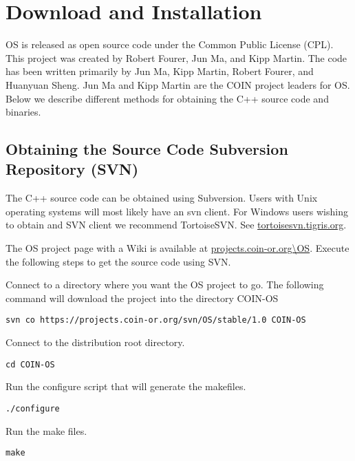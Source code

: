 \documentclass[11pt]{article}
\renewcommand{\_}{{\char"5F}}
\renewcommand{\{}{{\char"7B}}
\renewcommand{\}}{{\char"7D}}
\renewcommand{\^}{{\char"0D}}
\renewcommand{\'}{{\char"0D}}
\begin{document}
\section{Download and Installation}

OS is released as open source code under the Common Public License (CPL). This project was created by Robert Fourer, Jun Ma, and Kipp Martin. The code has been written primarily by Jun Ma, Kipp Martin, Robert Fourer, and Huanyuan Sheng.  Jun Ma and Kipp Martin are the COIN project leaders for OS. Below we describe different methods for obtaining the C++ source code and binaries. 

\subsection{Obtaining the Source Code Subversion Repository (SVN)}\label{section:svn}

The C++ source code can be obtained using Subversion.  Users with Unix operating systems will most likely have an svn client. For Windows users wishing to obtain and SVN client we recommend  TortoiseSVN.  See \url{tortoisesvn.tigris.org}.

The OS project page with a Wiki is available at \url{projects.coin-or.org\OS}. Execute the following steps to get the source code using SVN.

  Connect to a directory where you want the OS project to go.  The following command will download the project into the directory COIN-OS

\begin{verbatim}
svn co https://projects.coin-or.org/svn/OS/stable/1.0 COIN-OS
\end{verbatim}

  Connect to the distribution root directory.

\begin{verbatim}
cd COIN-OS
\end{verbatim}


 Run the configure script that will generate the makefiles. 

\begin{verbatim}
./configure
\end{verbatim}

  Run the make files.

\begin{verbatim}
make
\end{verbatim}
\end{document}
